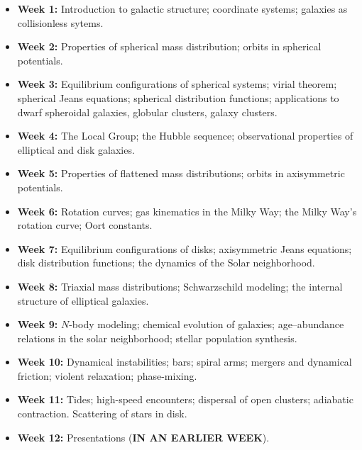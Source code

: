 \documentclass{article}
\begin{document}
\begin{itemize}

  \item {\bf Week 1:} Introduction to galactic structure; coordinate
    systems; galaxies as collisionless sytems.

  \item {\bf Week 2:} Properties of spherical mass distribution;
    orbits in spherical potentials.

  \item {\bf Week 3:} Equilibrium configurations of spherical systems;
    virial theorem; spherical Jeans equations; spherical distribution
    functions; applications to dwarf spheroidal galaxies, globular
    clusters, galaxy clusters.

  \item {\bf Week 4:} The Local Group; the Hubble sequence;
    observational properties of elliptical and disk galaxies.

  \item {\bf Week 5:} Properties of flattened mass distributions;
    orbits in axisymmetric potentials.

  \item {\bf Week 6:} Rotation curves; gas kinematics in the Milky
    Way; the Milky Way's rotation curve; Oort constants.

  \item {\bf Week 7:} Equilibrium configurations of disks;
    axisymmetric Jeans equations; disk distribution functions; the
    dynamics of the Solar neighborhood.

  \item {\bf Week 8:} Triaxial mass distributions; Schwarzschild
    modeling; the internal structure of elliptical galaxies.

  \item {\bf Week 9:} $N$-body modeling; chemical evolution of
    galaxies; age--abundance relations in the solar neighborhood;
    stellar population synthesis.

  \item {\bf Week 10:} Dynamical instabilities; bars; spiral arms;
 mergers and dynamical friction; violent relaxation; phase-mixing.

  \item {\bf Week 11:} Tides; high-speed encounters; dispersal of open
    clusters; adiabatic contraction. Scattering of stars in disk.

  \item {\bf Week 12:} Presentations ({\bf IN AN EARLIER WEEK}).

\end{itemize}
\end{document}

